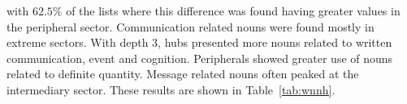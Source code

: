 \begin{itemize}
																																																																																																																																																																																																																																																																																																																																																					with $62.5\%$ of the lists where this difference was found having greater values in the peripheral sector.
																																																																																																																																																																																																																																																																																																																																																							Communication related nouns were found mostly in extreme sectors.
																																																																																																																																																																																																																																																																																																																																																									With depth 3, hubs presented more nouns related to written communication, event and cognition.
																																																																																																																																																																																																																																																																																																																																																											Peripherals showed greater use of nouns related to definite quantity.
																																																																																																																																																																																																																																																																																																																																																													Message related nouns often peaked at the intermediary sector.
																																																																																																																																																																																																																																																																																																																																																															These results are shown in Table~\ref{tab:wnnh}.

\end{itemize}
